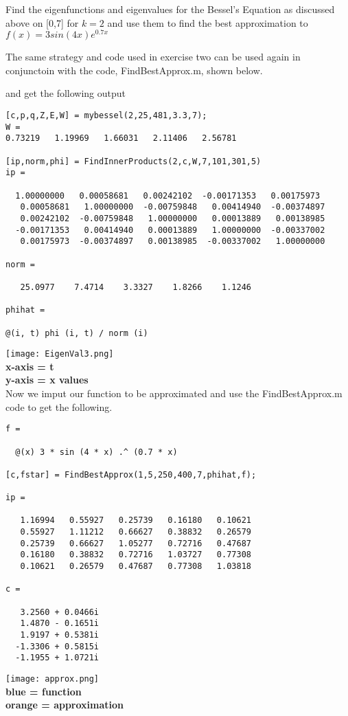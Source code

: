 \documentclass[11pt]{SelfArxOneColBMN}
\begin{document}
\begin{exercise}
  Find the eigenfunctions and eigenvalues for the Bessel's Equation as discussed above on [0,7] for $k =2$ and use them to find the best approximation to $f(x) = 3sin(4x)e^{0.7x}$
  \begin{solution}
    The same strategy and code used in exercise two can be used again in conjunctoin with the code, FindBestApprox.m, shown below.
    \singlespacing
    
    \onehalfspacing
  and get the following output
    \begin{lstlisting}
[c,p,q,Z,E,W] = mybessel(2,25,481,3.3,7);
W = 
0.73219   1.19969   1.66031   2.11406   2.56781

[ip,norm,phi] = FindInnerProducts(2,c,W,7,101,301,5)
ip =

  1.00000000   0.00058681   0.00242102  -0.00171353   0.00175973
   0.00058681   1.00000000  -0.00759848   0.00414940  -0.00374897
   0.00242102  -0.00759848   1.00000000   0.00013889   0.00138985
  -0.00171353   0.00414940   0.00013889   1.00000000  -0.00337002
   0.00175973  -0.00374897   0.00138985  -0.00337002   1.00000000

norm =

   25.0977    7.4714    3.3327    1.8266    1.1246

phihat =

@(i, t) phi (i, t) / norm (i)    
    \end{lstlisting}
    \texttt{[image: EigenVal3.png]}\\
    \centering
    \textbf{x-axis = t}\\
    \textbf{y-axis = x values}\\
Now we imput our function to be approximated and use the FindBestApprox.m code to get the following.
    \begin{lstlisting}
f =

  @(x) 3 * sin (4 * x) .^ (0.7 * x)

[c,fstar] = FindBestApprox(1,5,250,400,7,phihat,f);

ip =

   1.16994   0.55927   0.25739   0.16180   0.10621
   0.55927   1.11212   0.66627   0.38832   0.26579
   0.25739   0.66627   1.05277   0.72716   0.47687
   0.16180   0.38832   0.72716   1.03727   0.77308
   0.10621   0.26579   0.47687   0.77308   1.03818

c =

   3.2560 + 0.0466i
   1.4870 - 0.1651i
   1.9197 + 0.5381i
  -1.3306 + 0.5815i
  -1.1955 + 1.0721i
    \end{lstlisting}
    \texttt{[image: approx.png]}\\
    \centering
    \textbf{blue = function}\\
    \textbf{orange = approximation}\\

  \end{solution}
\end{exercise}
\end{document}
